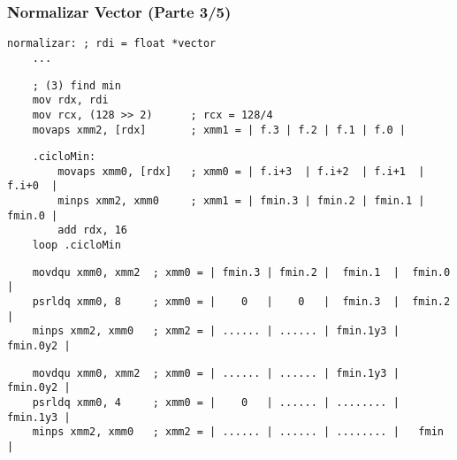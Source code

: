 \documentclass[aspectratio=169]{beamer}
\begin{document}
\begin{frame}[fragile,t]
    \frametitle{Normalizar Vector (Parte 3/5)}
    \footnotesize
    \begin{verbatim}
normalizar: ; rdi = float *vector
    ...
    \end{verbatim}
    \scriptsize
    \vspace{-0.8cm} \pause
    \begin{verbatim}
    ; (3) find min
    mov rdx, rdi
    mov rcx, (128 >> 2)      ; rcx = 128/4
    movaps xmm2, [rdx]       ; xmm1 = | f.3 | f.2 | f.1 | f.0 |
    \end{verbatim}
    \vspace{-0.8cm} %
    \begin{verbatim}
    .cicloMin:
        movaps xmm0, [rdx]   ; xmm0 = | f.i+3  | f.i+2  | f.i+1  | f.i+0  |
        minps xmm2, xmm0     ; xmm1 = | fmin.3 | fmin.2 | fmin.1 | fmin.0 |
        add rdx, 16
    loop .cicloMin
    \end{verbatim}
    \vspace{-0.8cm} \pause
    \begin{verbatim}
    movdqu xmm0, xmm2  ; xmm0 = | fmin.3 | fmin.2 |  fmin.1  |  fmin.0  |
    psrldq xmm0, 8     ; xmm0 = |    0   |    0   |  fmin.3  |  fmin.2  |
    minps xmm2, xmm0   ; xmm2 = | ...... | ...... | fmin.1y3 | fmin.0y2 |
    \end{verbatim}
    \vspace{-0.8cm} %
    \begin{verbatim}
    movdqu xmm0, xmm2  ; xmm0 = | ...... | ...... | fmin.1y3 | fmin.0y2 |
    psrldq xmm0, 4     ; xmm0 = |    0   | ...... | ........ | fmin.1y3 |
    minps xmm2, xmm0   ; xmm2 = | ...... | ...... | ........ |   fmin   |
    \end{verbatim}
\end{frame}
\end{document}
